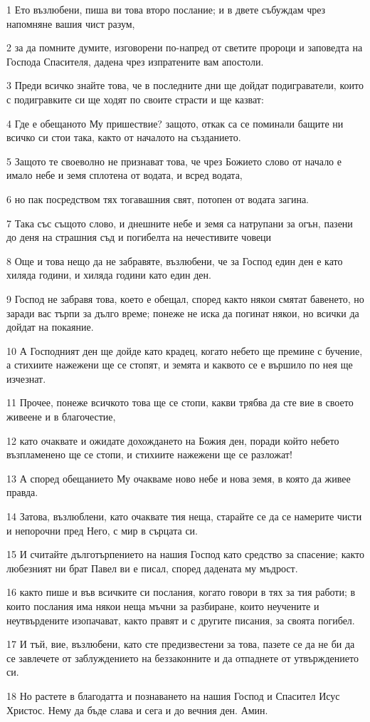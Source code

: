 \par 1 Ето възлюбени, пиша ви това второ послание; и в двете събуждам чрез напомняне вашия чист разум,
\par 2 за да помните думите, изговорени по-напред от светите пророци и заповедта на Господа Спасителя, дадена чрез изпратените вам апостоли.
\par 3 Преди всичко знайте това, че в последните дни ще дойдат подиграватели, които с подигравките си ще ходят по своите страсти и ще казват:
\par 4 Где е обещаното Му пришествие? защото, откак са се поминали бащите ни всичко си стои така, както от началото на създанието.
\par 5 Защото те своеволно не признават това, че чрез Божието слово от начало е имало небе и земя сплотена от водата, и всред водата,
\par 6 но пак посредством тях тогавашния свят, потопен от водата загина.
\par 7 Така със същото слово, и днешните небе и земя са натрупани за огън, пазени до деня на страшния съд и погибелта на нечестивите човеци
\par 8 Още и това нещо да не забравяте, възлюбени, че за Господ един ден е като хиляда години, и хиляда години като един ден.
\par 9 Господ не забравя това, което е обещал, според както някои смятат бавенето, но заради вас търпи за дълго време; понеже не иска да погинат някои, но всички да дойдат на покаяние.
\par 10 А Господният ден ще дойде като крадец, когато небето ще премине с бучение, а стихиите нажежени ще се стопят, и земята и каквото се е вършило по нея ще изчезнат.
\par 11 Прочее, понеже всичкото това ще се стопи, какви трябва да сте вие в своето живеене и в благочестие,
\par 12 като очаквате и ожидате дохождането на Божия ден, поради който небето възпламенено ще се стопи, и стихиите нажежени ще се разложат!
\par 13 А според обещанието Му очакваме ново небе и нова земя, в която да живее правда.
\par 14 Затова, възлюблени, като очаквате тия неща, старайте се да се намерите чисти и непорочни пред Него, с мир в сърцата си.
\par 15 И считайте дълготърпението на нашия Господ като средство за спасение; както любезният ни брат Павел ви е писал, според дадената му мъдрост.
\par 16 както пише и във всичките си послания, когато говори в тях за тия работи; в които послания има някои неща мъчни за разбиране, които неучените и неутвърдените изопачават, както правят и с другите писания, за своята погибел.
\par 17 И тъй, вие, възлюбени, като сте предизвестени за това, пазете се да не би да се завлечете от заблуждението на беззаконните и да отпаднете от утвърждението си.
\par 18 Но растете в благодатта и познаването на нашия Господ и Спасител Исус Христос. Нему да бъде слава и сега и до вечния ден. Амин.

